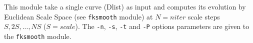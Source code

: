 This module take a single curve (Dlist) as input and computes its evolution
by Euclidean Scale Space (see \verb+fksmooth+ module) at $N=niter$ scale steps
$S,2S,...,NS$ ($S=scale$). The \verb+-n+, \verb+-s+, \verb+-t+ and \verb+-P+ 
options parameters are given to the \verb+fksmooth+ module. 
